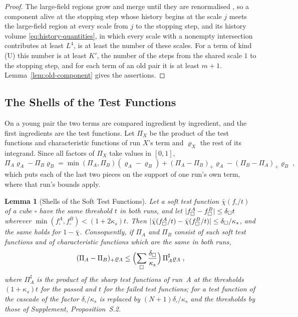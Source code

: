 \documentclass[11pt]{preprint}
\DeclarePairedDelimiter{\abs}{\lvert}{\rvert}
\numberwithin{equation}{section}
\newtheorem{lemma}[theorem]{Lemma}
\theoremstyle{definition}
\theoremstyle{remark}
\theoremstyle{plain}
\begin{document}
\begin{proof}
The large-field regions grow and merge until they are renormalised \cite[(0.3), p.~176]{BalabanLFR1}, so a component alive at the stopping step whose history begins at the scale $j$ meets the large-field region at every scale from $j$ to the stopping step, and its history volume \eqref{eq:history-quantities}, in which every scale with a nonempty intersection contributes at least $L^4$, is at least the number of these scales. For a term of kind (U) this number is at least $K'$, the number of the steps from the shared scale $1$ to the stopping step, and for each term of an old pair it is at least $m + 1$. Lemma~\ref{lem:old-component} gives the assertions.
\end{proof}

\subsection{The Shells of the Test Functions}\label{sec:shells}

On a young pair the two terms are compared ingredient by ingredient, and the first ingredients are the test functions. Let $\Pi_X$ be the product of the test functions and characteristic functions of run $X$'s term and $\varrho_X$ the rest of its integrand. Since all factors of $\Pi_X$ take values in $[0, 1]$,
\begin{equation}\label{eq:three-piece}
    \Pi_A\varrho_A - \Pi_B\varrho_B = \min(\Pi_A, \Pi_B)(\varrho_A - \varrho_B) + (\Pi_A - \Pi_B)_+\varrho_A - (\Pi_B - \Pi_A)_+\varrho_B\;,
\end{equation}
which puts each of the last two pieces on the support of one run's own term, where that run's bounds apply.

\begin{lemma}[Shells of the Soft Test Functions]\label{lem:soft-shells}
Let a soft test function $\bar\chi(f_\square/t)$ of a cube $\square$ have the same threshold $t$ in both runs, and let $\abs{f^A_\square - f^B_\square} \leq \delta_\square t$ wherever $\min(f^A_\square, f^B_\square) < (1 + 2\kappa_s)t$. Then $\abs{\bar\chi(f^A_\square/t) - \bar\chi(f^B_\square/t)} \leq \delta_\square/\kappa_s$, and the same holds for $1 - \bar\chi$. Consequently, if $\Pi_A$ and $\Pi_B$ consist of such soft test functions and of characteristic functions which are the same in both runs,
\begin{equation}\label{eq:soft-shell-bound}
    (\Pi_A - \Pi_B)_+\varrho_A \leq \Bigl(\sum_\square\frac{\delta_\square}{\kappa_s}\Bigr)\,\Pi^{\sharp}_A\varrho_A\;,
\end{equation}
where $\Pi^\sharp_A$ is the product of the sharp test functions of run~A at the thresholds $(1 + \kappa_s)t$ for the passed and $t$ for the failed test functions; for a test function of the cascade of \cite[(1.22)--(1.24), p.~181]{BalabanLFR1} the factor $\delta_\square/\kappa_s$ is replaced by $(N + 1)\delta_\square/\kappa_s$ and the thresholds by those of Supplement, Proposition~S.2.
\end{lemma}
\end{document}

